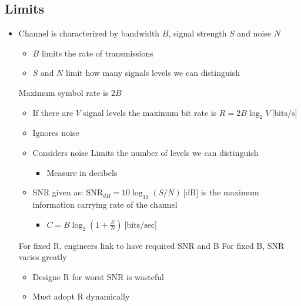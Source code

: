 \subsection{Limits}
\begin{itemize}
    \item Channel is characterized by bandwidth $B$, signal strength $S$ and noise $N$
        \begin{itemize}
            \item $B$ limits the rate of transmissions
            \item $S$ and $N$ limit how many signals levels we can distinguish
        \end{itemize}
     Maximum symbol rate is $2B$
        \begin{itemize}
            \item If there are $V$ signal levels the maximum bit rate is $R = 2B \log_2 V \ \text{[bits/s]}$
            \item Ignores noise
        \end{itemize}
        \begin{itemize}
            \item Considers noise
                 Limits the number of levels we can distinguish
                    \begin{itemize}
                        \item Measure in decibels
                    \end{itemize}
            \item SNR given as: $\text{SNR}_{dB} = 10 \log_{10} (S/N) \ \text{[dB]}$
             is the maximum information carrying rate of the channel
                \begin{itemize}
                    \item $C = B \log_2 (1 + \frac{S}{N}) \ \text{[bits/sec]}$
                \end{itemize}
        \end{itemize}
        \begin{itemize}
             For fixed R, engineers link to have required SNR and B
             For fixed B, SNR varies greatly
                \begin{itemize}
                    \item Designe R for worst SNR is wasteful
                    \item Must adopt R dynamically

\end{itemize}
\end{itemize}
\end{itemize}

